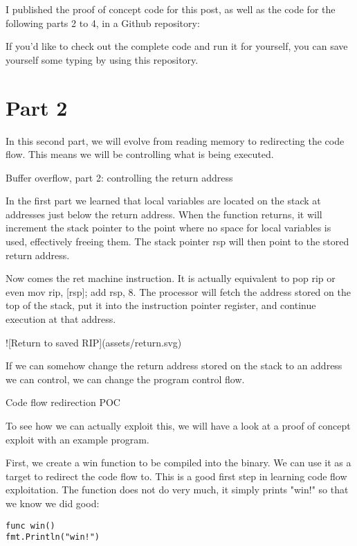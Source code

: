 I published the proof of concept code for this post, as well as the code for the following parts 2 to 4, in a Github
repository:

If you'd like to check out the complete code and run it for yourself, you can save yourself some typing by using this
repository.




\section{Part 2}

In this second part, we will evolve from reading memory to redirecting the code flow. This means we will be controlling
what is being executed.

Buffer overflow, part 2: controlling the return address

In the first part we learned that local variables are located on the stack at addresses just below the return address.
When the function returns, it will increment the stack pointer to the point where no space for local variables is used,
effectively freeing them. The stack pointer rsp will then point to the stored return address.

Now comes the ret machine instruction. It is actually equivalent to pop rip or even mov rip, [rsp]; add rsp, 8.
The processor will fetch the address stored on the top of the stack, put it into the instruction pointer register, and
continue execution at that address.

![Return to saved RIP](assets/return.svg)

If we can somehow change the return address stored on the stack to an address we can control, we can change the program
control flow.


Code flow redirection POC

To see how we can actually exploit this, we will have a look at a proof of concept exploit with an example program.

First, we create a win function to be compiled into the binary. We can use it as a target to redirect the code
flow to. This is a good first step in learning code flow exploitation. The function does not do very much, it simply prints
"win!" so that we know we did good:

\begin{lstlisting}[language=Golang, label=lst:win-function, caption=Target function \texttt{win} for code flow redirection]
func win()
fmt.Println("win!")
\end{lstlisting}

